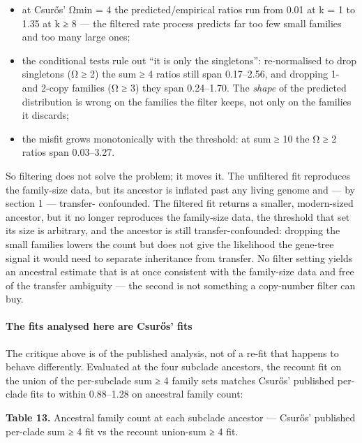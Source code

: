 \documentclass[
  10pt,
]{article}
\providecommand{\tightlist}{%
  \setlength{\itemsep}{0pt}\setlength{\parskip}{0pt}}
\begin{document}
\begin{itemize}
\tightlist
\item
  at Csurős' Ωmin = 4 the predicted/empirical ratios run from 0.01 at k
  = 1 to 1.35 at k ≥ 8 --- the filtered rate process predicts far too
  few small families and too many large ones;
\item
  the conditional tests rule out ``it is only the singletons'':
  re-normalised to drop singletons (Ω ≥ 2) the sum ≥ 4 ratios still span
  0.17--2.56, and dropping 1- and 2-copy families (Ω ≥ 3) they span
  0.24--1.70. The \emph{shape} of the predicted distribution is wrong on
  the families the filter keeps, not only on the families it discards;
\item
  the misfit grows monotonically with the threshold: at sum ≥ 10 the Ω ≥
  2 ratios span 0.03--3.27.
\end{itemize}

So filtering does not solve the problem; it moves it. The unfiltered fit
reproduces the family-size data, but its ancestor is inflated past any
living genome and --- by section 1 --- transfer- confounded. The
filtered fit returns a smaller, modern-sized ancestor, but it no longer
reproduces the family-size data, the threshold that set its size is
arbitrary, and the ancestor is still transfer-confounded: dropping the
small families lowers the count but does not give the likelihood the
gene-tree signal it would need to separate inheritance from transfer. No
filter setting yields an ancestral estimate that is at once consistent
with the family-size data and free of the transfer ambiguity --- the
second is not something a copy-number filter can buy.

\paragraph{The fits analysed here are Csurős'
fits}\label{the-fits-analysed-here-are-csurux151s-fits}

The critique above is of the published analysis, not of a re-fit that
happens to behave differently. Evaluated at the four subclade ancestors,
the recount fit on the union of the per-subclade sum ≥ 4 family sets
matches Csurős' published per-clade fits to within 0.88--1.28 on
ancestral family count:

\textbf{Table 13.} Ancestral family count at each subclade ancestor ---
Csurős' published per-clade sum ≥ 4 fit vs the recount union-sum ≥ 4
fit.
\end{document}
